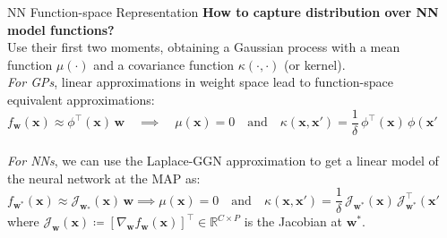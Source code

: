 \documentclass[final,12pt]{beamer}
\newcommand{\mbf}[1]{\mathbf{#1}}
\newcommand{\weights}{\ensuremath{\mathbf{w}}}
\newcommand{\T}{\top}
\newcommand{\vx}{\mbf{x}}
\newcommand{\vw}{\mbf{w}}
\newcommand{\Jac}[2]{\mathcal{J}_{#1}(#2)}
\newcommand{\JacT}[2]{\mathcal{J}_{#1}^\top(#2)}
\newcommand{\R}{\mathbb{R}}
\newlength{\sepwidth}
\newlength{\colwidth}
\newcommand{\separatorcolumn}{\begin{column}{\sepwidth}\end{column}}
\begin{document}
\begin{frame}[t]
\begin{columns}[t]
\begin{column}{\colwidth}
\begin{block}{NN Function-space Representation}
\alert{\bf How to capture distribution over NN model functions?}	\\
Use their first two moments, obtaining a Gaussian process with a \alert{mean function $\mu(\cdot)$} and a \alert{covariance function $\kappa(\cdot,\cdot)$} (or kernel). \\
{\it For GPs}, linear approximations in weight space lead to function-space equivalent approximations:
\begin{equation*}
	f_\weights(\vx) \approx 
\phi^\top\!(\vx) \, \vw \quad\implies\quad \mu(\vx) = 0 \quad \text{and} \quad \kappa(\vx, \vx') = \frac{1}{\delta} \, \phi^\T\!(\vx) \, \phi(\vx')
\end{equation*}\\
{\it For NNs}, we can use the \alert{Laplace-GGN approximation} to get a linear model of the neural network at the MAP as:
\begin{equation*}
	f_{\weights^*}(\vx) \approx \Jac{\weights_*}{\vx} \, \weights \implies   \mu(\vx) =  0 \quad \text{and} \quad
  \kappa(\vx, \vx')
  = \frac{1}{\delta} \, \Jac{\weights^*}{\vx} \, \JacT{\weights^*}{\vx'}, 
\end{equation*}
where $\Jac{\weights}{\vx} \coloneqq \left[ \nabla_\weights f_\weights(\vx)\right]^\top \in \R^{C \times P}$ is the Jacobian at $\weights^*$.
\end{block}
\end{column}

\separatorcolumn


\end{columns}
\end{frame}
\end{document}
